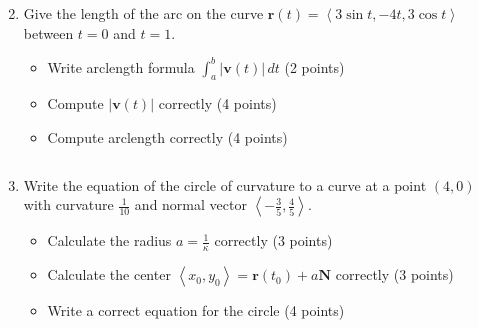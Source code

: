 \documentclass[12pt]{article}
\newcommand{\up}{$~$\vspace*{-0.7in}}
\newcommand{\liner}{\noindent\underline{\hspace*{7in}}}
\newcommand{\ds}{\displaystyle}
\renewcommand{\vec}{\mathbf}
\newcommand{\<}{\left<}
\renewcommand{\>}{\right>}
\newcommand{\dvar}{\,d}
\begin{document}
\begin{enumerate}
\vspace*{6.5in}

\liner

\newpage\up


\item Give the length of the arc on the curve $\vec{r}(t) = \left< 3\sin t, -4t, 3\cos t \right>$ between $t=0$ and $t=1$.

  \begin{itemize}
    \item Write arclength formula $\ds \int_a^b |\vec{v}(t)| \dvar{t}$ (2 points)
    \item Compute $|\vec{v}(t)|$ correctly (4 points)
    \item Compute arclength correctly (4 points)
  \end{itemize}

\vspace*{8in}

\liner
\newpage\up


\item Write the equation of the circle of curvature to a curve at a point $(4,0)$ with curvature $\frac{1}{10}$ and normal vector $\left<-\frac{3}{5},\frac{4}{5}\right>$.

  \begin{itemize}
    \item Calculate the radius $a = \frac{1}{\kappa}$ correctly (3 points)
    \item Calculate the center $\<x_0,y_0\> = \vec{r}(t_0) + a\vec{N}$ correctly (3 points)
    \item Write a correct equation for the circle (4 points)
  \end{itemize}

\vspace*{7.5in}

\liner
\newpage\up




\end{enumerate}
\end{document}
